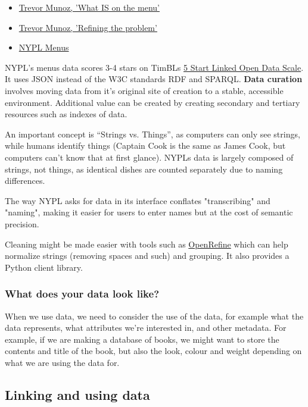 \begin{itemize}
	\item \href{http://trevormunoz.com/notebook/2013/08/08/what-is-on-the-menu-more-work-with-nypl-open-data-part-one.html}{Trevor Munoz, 'What IS on the menu'}
	\item \href{http://trevormunoz.com/notebook/2013/08/19/refining-the-problem-more-work-with-nypl-open-data-part-two.html}{Trevor Munoz, 'Refining the problem'}
	\item \href{http://menus.nypl.org/menus}{NYPL Menus}
\end{itemize}

NYPL's menus data scores 3-4 stars on TimBLs \href{http://www.w3.org/DesignIssues/LinkedData.html}{5 Start Linked Open Data Scale}. It uses JSON instead of the W3C standards RDF and SPARQL. \textbf{Data curation} involves moving data from it's original site of creation to a stable, accessible environment. Additional value can be created by creating secondary and tertiary resources such as indexes of data.

An important concept is ``Strings vs. Things'', as computers can only see strings, while humans identify things (Captain Cook is the same as James Cook, but computers can't know that at first glance). NYPLs data is largely composed of strings, not things, as identical dishes are counted separately due to naming differences.

The way NYPL asks for data in its interface conflates "transcribing" and "naming", making it easier for users to enter names but at the cost of semantic precision.

Cleaning might be made easier with tools such as \href{https://openrefine.org/}{OpenRefine} which can help normalize strings (removing spaces and such) and grouping. It also provides a Python client library.

\subsubsection{What does your data look like?}

When we use data, we need to consider the use of the data, for example what the data represents, what attributes we're interested in, and other metadata. For example, if we are making a database of books, we might want to store the contents and title of the book, but also the look, colour and weight depending on what we are using the data for.

\subsection{Linking and using data}

